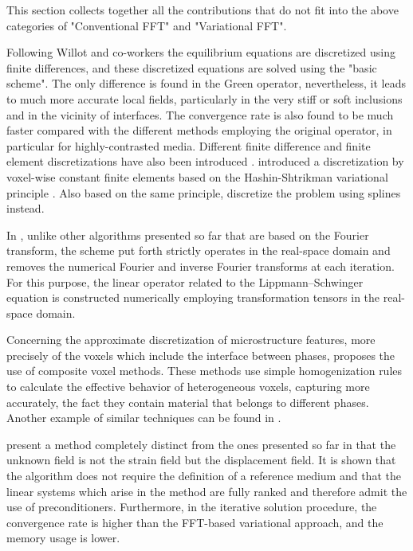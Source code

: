 This section collects together all the contributions that do not fit into the above categories of "Conventional FFT" and "Variational FFT".


Following Willot and co-workers \citep{willot_fast_2008, willot_fourier-based_2014, willot_fourier-based_2015} the equilibrium equations are discretized using finite differences, and these discretized equations are solved using the "basic scheme".
The only difference is found in the Green operator, nevertheless, it leads to much more accurate local fields, particularly in the very stiff or soft inclusions and in the vicinity of interfaces.
The convergence rate is also found to be much faster compared with the different methods employing the original operator, in particular for highly-contrasted media.
Different finite difference and finite element discretizations have also been introduced \citep{schneider_computational_2016, schneider_fft-based_2017, djaka_field_2017, eloh_development_2019}.
\cite{brisard_fft-based_2010, brisard_combining_2012} introduced a discretization by voxel-wise constant finite elements based on the Hashin-Shtrikman variational principle \citep{hashin_variational_1962}.
Also based on the same principle, \cite{tu_implementation_2020} discretize the problem using splines instead.

In \cite{yvonnet_fast_2012}, unlike other algorithms presented so far that are based on the Fourier transform, the scheme put forth strictly operates in the real-space domain and removes the numerical Fourier and inverse Fourier transforms at each iteration. For this purpose, the linear operator related to the Lippmann–Schwinger equation is constructed numerically employing transformation tensors in the real-space domain.

Concerning the approximate discretization of microstructure features, more precisely of the voxels which include the interface between phases, \cite{mareau_different_2017} proposes the use of composite voxel methods.
These methods use simple homogenization rules to calculate the effective behavior of heterogeneous voxels, capturing more accurately, the fact they contain material that belongs to different phases.
Another example of similar techniques can be found in \cite{kabel_composite_2017}.

\cite{lucarini_dbfft_2019} present a method completely distinct from the ones presented so far in that the unknown field is not the strain field but the displacement field.
It is shown that the algorithm does not require the definition of a reference medium and that the linear systems which arise in the method are fully ranked and therefore admit the use of preconditioners.
Furthermore, in the iterative solution procedure, the convergence rate is higher than the FFT-based variational approach, and the memory usage is lower.

